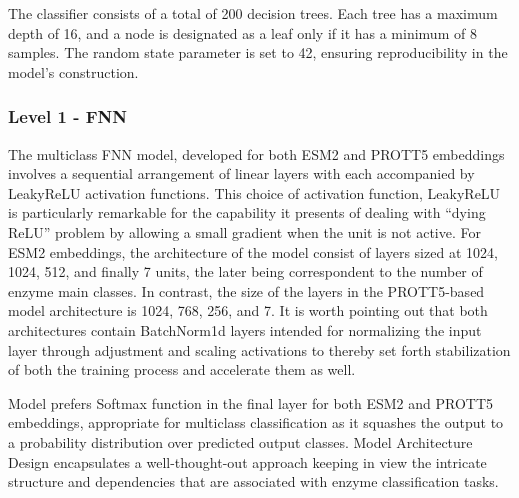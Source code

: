 \documentclass{bioinfo}
\begin{document}
\begin{methods}
The classifier consists of a total of 200 decision trees.
Each tree has a maximum depth of 16, and a node is designated as a leaf only if it has a minimum of 8 samples.
The random state parameter is set to 42, ensuring reproducibility in the model's construction.
\subsubsection{Level 1 - FNN}
The multiclass FNN model, developed for both ESM2 and PROTT5 embeddings involves a sequential arrangement of linear layers with each accompanied by LeakyReLU activation functions.
This choice of activation function, LeakyReLU is particularly remarkable for the capability it presents of dealing with “dying ReLU”%
problem by allowing a small gradient when the unit is not active. 
For ESM2 embeddings, the architecture of the model consist of layers sized at 1024, 1024, 512, and finally 7 units, the later being correspondent 
to the number of enzyme main classes. In contrast, the size of the layers in the PROTT5-based model architecture is 1024, 768, 256, and 7.
It is worth pointing out that both architectures contain BatchNorm1d layers intended for normalizing the input layer through adjustment
and scaling activations to thereby set 
forth stabilization of both the training process and accelerate them as well.

Model prefers Softmax function in the final layer for both ESM2 and PROTT5 embeddings, %
appropriate for multiclass classification as it squashes the output to a probability distribution over predicted output classes.
Model Architecture Design encapsulates a well-thought-out approach keeping in view the intricate structure and dependencies that 
are associated with enzyme classification tasks.


\end{methods}
\end{document}

